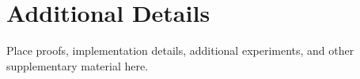 \section{Additional Details}
\label{sec:appendix}

Place proofs, implementation details, additional experiments, and other supplementary material here.

